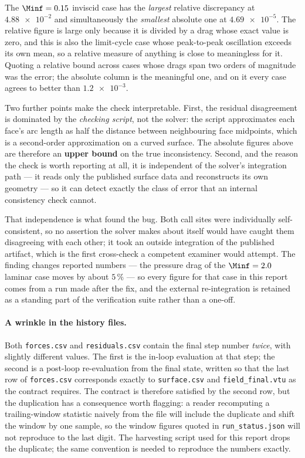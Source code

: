 \noindent The $\Minf=0.15$ inviscid case has the \emph{largest} relative discrepancy at
$\num{4.88e-2}$ and simultaneously the \emph{smallest} absolute one at $\num{4.69e-5}$.
The relative figure is large only because it is divided by a drag whose exact value is
zero, and this is also the limit-cycle case whose peak-to-peak oscillation exceeds its own
mean, so a relative measure of anything is close to meaningless for it. Quoting a relative
bound across cases whose drags span two orders of magnitude was the error; the absolute
column is the meaningful one, and on it every case agrees to better than
$\num{1.2e-3}$.

Two further points make the check interpretable. First, the residual disagreement is
dominated by the \emph{checking script}, not the solver: the script approximates each
face's arc length as half the distance between neighbouring face midpoints, which is a
second-order approximation on a curved surface. The absolute figures above are therefore
an \textbf{upper bound} on the true inconsistency. Second, and the reason the check is
worth reporting at all, it is independent of the solver's integration path --- it reads
only the published surface data and reconstructs its own geometry --- so it can detect
exactly the class of error that an internal consistency check cannot.

That independence is what found the bug. Both call sites were individually
self-consistent, so no assertion the solver makes about itself would have caught them
disagreeing with each other; it took an outside integration of the published artifact,
which is the first cross-check a competent examiner would attempt. The finding changes
reported numbers --- the pressure drag of the $\Minf=2.0$ laminar case moves by about
$5\,\%$ --- so every figure for that case in this report comes from a run made after the
fix, and the external re-integration is retained as a standing part of the verification
suite rather than a one-off.

\paragraph{A wrinkle in the history files.} Both \texttt{forces.csv} and
\texttt{residuals.csv} contain the final step number \emph{twice}, with slightly
different values. The first is the in-loop evaluation at that step; the second is a
post-loop re-evaluation from the final state, written so that the last row of
\texttt{forces.csv} corresponds exactly to \texttt{surface.csv} and
\texttt{field\_final.vtu} as the contract requires. The contract is therefore
satisfied by the second row, but the duplication has a consequence worth flagging: a
reader recomputing a trailing-window statistic naively from the file will include
the duplicate and shift the window by one sample, so the window figures quoted in
\texttt{run\_status.json} will not reproduce to the last digit. The harvesting script
used for this report drops the duplicate; the same convention is needed to reproduce
the numbers exactly.


